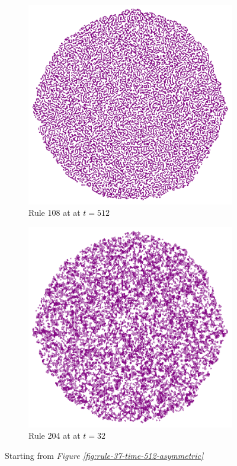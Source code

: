 \documentclass{article}
\begin{document}
\begin{figure}[H]
\begin{subfigure}[b]{0.32\textwidth}
        \includegraphics[width=\textwidth]{graphics/behavior/textures/rule-108-time-512-noise.pdf}
        \caption{Rule 108 at at $t=512$}
        \label{fig:rule-108-time-512-noise}
    \end{subfigure}
    \begin{subfigure}[b]{0.32\textwidth}
        \centering
        \includegraphics[width=\textwidth]{graphics/behavior/textures/rule-204-time-32-noise.pdf}
        \caption{Rule 204 at at $t=32$}
        \label{fig:rule-204-time-32-noise}
    \end{subfigure}
       \caption{Starting from \textit{Figure \ref{fig:rule-37-time-512-asymmetric}}}
       \label{fig:textures}
\end{figure}
\end{document}

